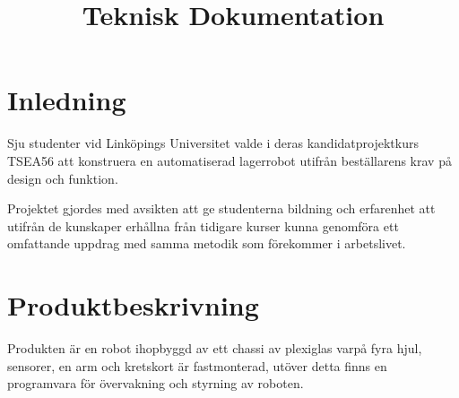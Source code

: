 \documentclass[a4paper,12pt]{article}
\title{Teknisk Dokumentation}
\renewcommand{\thepage}{\roman{page}}
\begin{document}
\LIPStitelsida

\begin{LIPSprojektidentitet}
\end{LIPSprojektidentitet}


\renewcommand*\contentsname{Innehåll}
\begin{spacing}{0.5}
\tableofcontents{}
\end{spacing}
\newpage

\begin{LIPSdokumenthistorik}
\end{LIPSdokumenthistorik}
\newpage

\renewcommand{\thepage}{\arabic{page}}
\setcounter{page}{1}

\section{Inledning}
Sju studenter vid Linköpings Universitet valde i deras kandidatprojektkurs TSEA56 att konstruera en automatiserad lagerrobot utifrån beställarens krav på design och funktion.

Projektet gjordes med avsikten att ge studenterna bildning och erfarenhet att utifrån de kunskaper erhållna från tidigare kurser kunna genomföra ett omfattande uppdrag med samma metodik som förekommer i arbetslivet.


\section{Produktbeskrivning}
Produkten är en robot ihopbyggd av ett chassi av plexiglas varpå fyra hjul, sensorer, en arm och kretskort är fastmonterad, utöver detta finns en programvara för övervakning och styrning av roboten.
\end{document}
